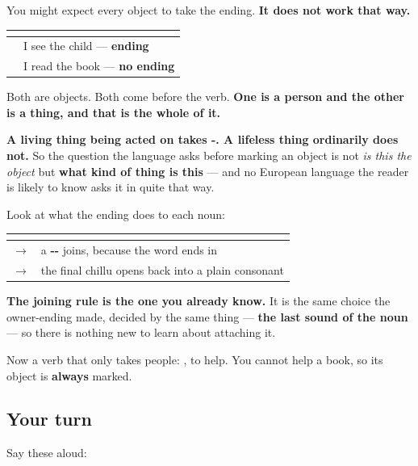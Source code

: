 \begin{grammarlens}[title={Grammar Lens: what kind of thing the object is}]
You might expect every object to take the ending. \textbf{It does not work that way.}

\noindent
\begin{tabularx}{\linewidth}{@{}>{\raggedright\arraybackslash}X>{\raggedright\arraybackslash}X@{}}
\toprule
\textbf{} & \textbf{} \\
\midrule
\textbf{\ml{ഞാൻ} \ml{കുട്ടിയെ} \ml{കാണുന്നു}} & I see the child — \textbf{ending} \\
\textbf{\ml{ഞാൻ} \ml{പുസ്തകം} \ml{വായിക്കുന്നു}} & I read the book — \textbf{no ending} \\
\bottomrule
\end{tabularx}

Both are objects. Both come before the verb. \textbf{One is a person and the other is a thing, and that is the whole of it.}

\textbf{A living thing being acted on takes -. A lifeless thing ordinarily does not.} So the question the language asks before marking an object is not \emph{is this the object} but \textbf{what kind of thing is this} — and no European language the reader is likely to know asks it in quite that way.

Look at what the ending does to each noun:

\noindent
\begin{tabularx}{\linewidth}{@{}>{\raggedright\arraybackslash}X>{\raggedright\arraybackslash}X@{}}
\toprule
\textbf{} & \textbf{} \\
\midrule
\textbf{\ml{കുട്ടി}} $\to$ \textbf{\ml{കുട്ടിയെ}} & a \textbf{-\ml{യ}-} joins, because the word ends in \textbf{\ml{ഇ}} \\
\textbf{\ml{അധ്യാപകൻ}} $\to$ \textbf{\ml{അധ്യാപകനെ}} & the final chillu opens back into a plain consonant \\
\bottomrule
\end{tabularx}

\textbf{The joining rule is the one you already know.} It is the same choice the owner-ending made, decided by the same thing — \textbf{the last sound of the noun} — so there is nothing new to learn about attaching it.

Now a verb that only takes people: \textbf{}, to help. You cannot help a book, so its object is \textbf{always} marked.
\end{grammarlens}

\subsection*{Your turn}
Say these aloud:

